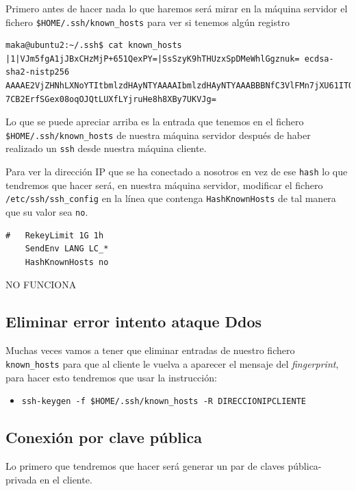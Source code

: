 \documentclass[11pt]{article}
\begin{document}
Primero antes de hacer nada lo que haremos será mirar en la máquina servidor el fichero \texttt{\$HOME/.ssh/known\_hosts} para ver si tenemos algún registro
\begin{verbatim}
maka@ubuntu2:~/.ssh$ cat known_hosts 
|1|VJm5fgA1jJBxCHzMjP+651QexPY=|SsSzyK9hTHUzxSpDMeWhlGgznuk= ecdsa-sha2-nistp256 AAAAE2VjZHNhLXNoYTItbmlzdHAyNTYAAAAIbmlzdHAyNTYAAABBBNfC3VlFMn7jXU61ITQBxbRBRTv8E5Z/hNokk5W12Hgac
7CB2ErfSGex08oqOJQtLUXfLYjruHe8h8XBy7UKVJg=
\end{verbatim}

Lo que se puede apreciar arriba es la entrada que tenemos en el fichero \texttt{\$HOME/.ssh/known\_hosts} de nuestra máquina servidor después de haber realizado un \texttt{ssh} desde nuestra máquina cliente.

Para ver la dirección IP que se ha conectado a nosotros en vez de ese \texttt{hash} lo que tendremos que hacer será, en nuestra máquina servidor, modificar el fichero \texttt{/etc/ssh/ssh\_config} en la
línea que contenga \texttt{HashKnownHosts} de tal manera que su valor sea \texttt{no}.
\begin{verbatim}
#   RekeyLimit 1G 1h
    SendEnv LANG LC_*
    HashKnownHosts no
\end{verbatim}

NO FUNCIONA
\subsection{Eliminar error intento ataque Ddos}
\label{sec:orgbe324f3}
Muchas veces vamos a tener que eliminar entradas de nuestro fichero \texttt{known\_hosts} para que al cliente le vuelva a aparecer el mensaje del \emph{fingerprint}, para hacer esto tendremos que usar
la instrucción:
\begin{itemize}
\item \texttt{ssh-keygen -f \$HOME/.ssh/known\_hosts -R DIRECCIONIPCLIENTE}
\end{itemize}
\subsection{Conexión por clave pública}
\label{sec:org0f8f338}
Lo primero que tendremos que hacer será generar un par de claves pública-privada en el cliente.
\end{document}
